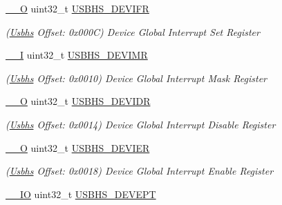 \begin{DoxyCompactItemize}
\mbox{\hyperlink{core__cm7_8h_a7e25d9380f9ef903923964322e71f2f6}{\+\_\+\+\_\+O}} uint32\+\_\+t \mbox{\hyperlink{structUsbhs_a645e27f23e778bd26cf1282a7009fa00}{U\+S\+B\+H\+S\+\_\+\+D\+E\+V\+I\+FR}}
\begin{DoxyCompactList}\small\item\em (\mbox{\hyperlink{structUsbhs}{Usbhs}} Offset\+: 0x000C) Device Global Interrupt Set Register \end{DoxyCompactList}\item 
\mbox{\label{structUsbhs_a8a2a43c4841abc9d3943e177bf019da9}} 
\mbox{\hyperlink{core__cm7_8h_af63697ed9952cc71e1225efe205f6cd3}{\+\_\+\+\_\+I}} uint32\+\_\+t \mbox{\hyperlink{structUsbhs_a8a2a43c4841abc9d3943e177bf019da9}{U\+S\+B\+H\+S\+\_\+\+D\+E\+V\+I\+MR}}
\begin{DoxyCompactList}\small\item\em (\mbox{\hyperlink{structUsbhs}{Usbhs}} Offset\+: 0x0010) Device Global Interrupt Mask Register \end{DoxyCompactList}\item 
\mbox{\label{structUsbhs_a16d6774c352a3fbdb47e5ce9ffcbdf04}} 
\mbox{\hyperlink{core__cm7_8h_a7e25d9380f9ef903923964322e71f2f6}{\+\_\+\+\_\+O}} uint32\+\_\+t \mbox{\hyperlink{structUsbhs_a16d6774c352a3fbdb47e5ce9ffcbdf04}{U\+S\+B\+H\+S\+\_\+\+D\+E\+V\+I\+DR}}
\begin{DoxyCompactList}\small\item\em (\mbox{\hyperlink{structUsbhs}{Usbhs}} Offset\+: 0x0014) Device Global Interrupt Disable Register \end{DoxyCompactList}\item 
\mbox{\label{structUsbhs_a296df4fd18fd58b2529de5cd58fde1b4}} 
\mbox{\hyperlink{core__cm7_8h_a7e25d9380f9ef903923964322e71f2f6}{\+\_\+\+\_\+O}} uint32\+\_\+t \mbox{\hyperlink{structUsbhs_a296df4fd18fd58b2529de5cd58fde1b4}{U\+S\+B\+H\+S\+\_\+\+D\+E\+V\+I\+ER}}
\begin{DoxyCompactList}\small\item\em (\mbox{\hyperlink{structUsbhs}{Usbhs}} Offset\+: 0x0018) Device Global Interrupt Enable Register \end{DoxyCompactList}\item 
\mbox{\label{structUsbhs_a3b64f65e7831453e1c648c2704e6214a}} 
\mbox{\hyperlink{core__cm7_8h_aec43007d9998a0a0e01faede4133d6be}{\+\_\+\+\_\+\+IO}} uint32\+\_\+t \mbox{\hyperlink{structUsbhs_a3b64f65e7831453e1c648c2704e6214a}{U\+S\+B\+H\+S\+\_\+\+D\+E\+V\+E\+PT}}

\end{DoxyCompactItemize}
